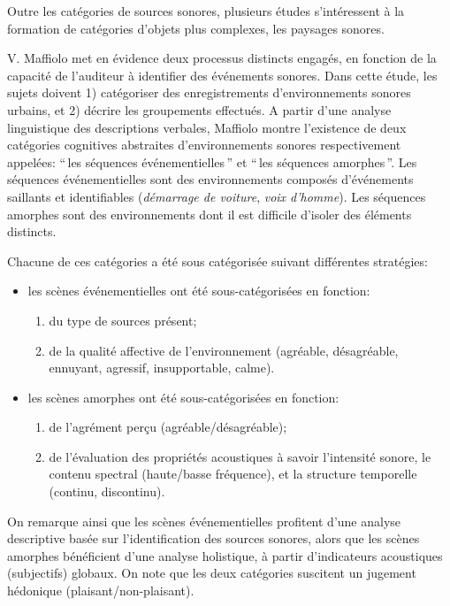 Outre les catégories de sources sonores, plusieurs études s’intéressent à la formation de catégories d'objets plus complexes, les paysages sonores.

V. Maffiolo \citep{maffiolo_caracterisation_1999} met en évidence deux processus distincts engagés, en fonction de la capacité de l'auditeur à identifier des événements sonores. Dans cette étude, les sujets doivent 1) catégoriser des enregistrements d'environnements sonores urbains, et 2) décrire les groupements effectués. A partir d'une analyse linguistique des descriptions verbales, Maffiolo montre l'existence de deux catégories cognitives abstraites d'environnements sonores respectivement appelées: ``\,les séquences événementielles\,'' et ``\,les séquences amorphes\,''. Les séquences événementielles sont des environnements composés d'événements saillants et identifiables (\emph{démarrage de voiture}, \emph{voix d'homme}). Les séquences amorphes sont des environnements dont il est difficile d'isoler des éléments distincts.

Chacune de ces catégories a été sous catégorisée suivant différentes stratégies:

\begin{itemize}
\item les scènes événementielles ont été sous-catégorisées en fonction:
\begin{enumerate}
\item du type de sources présent;
\item de la qualité affective de l'environnement (agréable, désagréable, ennuyant, agressif, insupportable, calme).
\end{enumerate}
\item les scènes amorphes ont été sous-catégorisées en fonction:
\begin{enumerate}
\item de l'agrément perçu (agréable/désagréable);
\item de l'évaluation des propriétés acoustiques à savoir l'intensité sonore, le contenu spectral (haute/basse fréquence), et la structure temporelle (continu, discontinu).
\end{enumerate}
\end{itemize}

On remarque ainsi que les scènes événementielles profitent d'une analyse descriptive basée sur l'identification des sources sonores, alors que les scènes amorphes bénéficient d'une analyse holistique, à partir d'indicateurs acoustiques (subjectifs) globaux. On note que les deux catégories suscitent un jugement hédonique (plaisant/non-plaisant).

